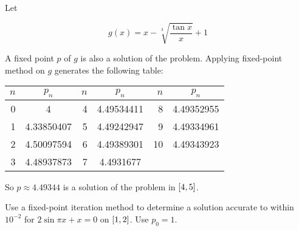 \documentclass[../../../../Assignments]{subfiles}
\begin{document}
\begin{solution}
    Let

    \[g(x) = x - \sqrt[3]{\frac{\tan{x}}{x}} + 1\]

    A fixed point \(p\) of \(g\) is also a solution of the problem. Applying
    fixed-point method on \(g\) generates the following table:

    \begin{table}[H]
        \centering
        \begin{tabular}{r S[table-format=1.8] r S[table-format=1.8] r S[table-format=1.8]}
            \toprule
            \(n\)  &   {\(p_n\)}   &  \(n\)  &   {\(p_n\)}   &  \(n\)  &   {\(p_n\)}   \\
              &  4            &      4  &  4.49534411   &      8  &  4.49352955   \\
                1  &  4.33850407   &      5  &  4.49242947   &      9  &  4.49334961   \\
                2  &  4.50097594   &      6  &  4.49389301   &     10  &  4.49343923   \\
                3  &  4.48937873   &      7  &  4.4931677    &         &               \\
            \bottomrule
        \end{tabular}
    \end{table}

    So \(p \approx \num{4.49344}\) is a solution of the problem in
    \(\interval{4}{5}\).
\end{solution}

\begin{exercise}
    Use a fixed-point iteration method to determine a solution accurate to
    within \(10^{-2}\) for \(2 \sin{\pi x} + x = 0\) on \(\interval{1}{2}\). Use
    \(p_0 = 1\).
\end{exercise}
\end{document}
